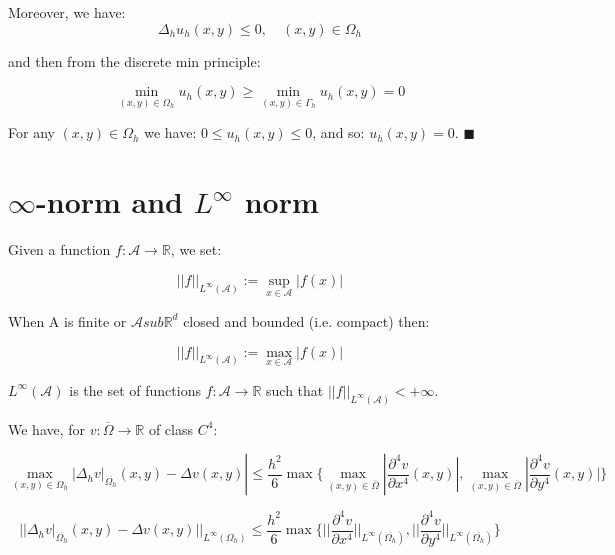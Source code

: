 Moreover, we have:
\begin{equation*}
\Delta_h u_h(x, y) \le 0, \quad (x, y) \in \Omega_h
\end{equation*}

and then from the discrete min principle:

\begin{equation*}
\min_{(x, y) \in \Omega_h} u_h(x, y) \ge \min_{(x, y) \in \Gamma_h} u_h(x, y) = 0
\end{equation*}

For any $(x, y) \in \Omega_h$ we have: $0 \le u_h(x, y) \le 0$, and so: $u_h(x, y) = 0$. $\blacksquare$

\section{$\infty$-norm and $L^\infty$ norm}

Given a function $f: \mathcal{A} \rightarrow \mathbb{R}$, we set:

\begin{equation*}
||f||_{L^\infty(\mathcal{A})} := \sup_{x \in \mathcal{A}} |f(x)|
\end{equation*}

When A is finite or $\mathcal{A} sub \mathbb{R}^d$ closed and bounded (i.e. compact) then:

\begin{equation*}
||f||_{L^\infty(\mathcal{A})} := \max_{x \in \mathcal{A}} |f(x)|
\end{equation*}

$L^\infty(\mathcal{A})$ is the set of functions $f: \mathcal{A} \rightarrow \mathbb{R}$ such that $||f||_{L^\infty(\mathcal{A})} < +\infty$.

We have, for $v: \overline{\Omega} \rightarrow \mathbb{R}$ of class $C^4$:

\begin{equation*}
\max_{(x, y) \in \Omega_h} {|\Delta_h v|}_{\overline{\Omega_h}} (x, y) - \Delta v(x, y)| \le \frac{h^2}{6} \max\{\max_{(x, y) \in \overline{\Omega}} |\frac{\partial^4 v}{\partial x^4} (x, y)|, \max_{(x, y) \in \overline{\Omega}} |\frac{\partial^4 v}{\partial y^4} (x, y)|\}
\end{equation*}

\begin{equation*}
||\Delta_h v{|}_{\overline{\Omega_h}} (x, y) - \Delta v(x, y)||_{L^\infty(\Omega_h)} \le \frac{h^2}{6} \max\{ ||\frac{\partial^4 v}{\partial x^4}||_{L^\infty(\overline{\Omega_h})}, ||\frac{\partial^4 v}{\partial y^4}||_{L^\infty(\overline{\Omega_h})} \}
\end{equation*}

